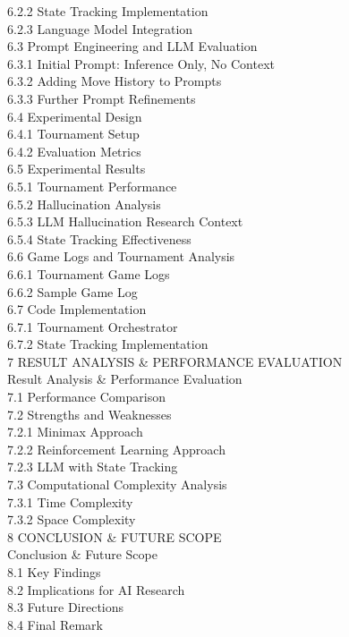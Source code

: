 \documentclass[11pt,a4paper]{report}
\begin{document}
6.2.2 State Tracking Implementation \\
6.2.3 Language Model Integration \\
6.3 Prompt Engineering and LLM Evaluation \\
6.3.1 Initial Prompt: Inference Only, No Context \\
6.3.2 Adding Move History to Prompts \\
6.3.3 Further Prompt Refinements \\
6.4 Experimental Design \\
6.4.1 Tournament Setup \\
6.4.2 Evaluation Metrics \\
6.5 Experimental Results \\
6.5.1 Tournament Performance \\
6.5.2 Hallucination Analysis \\
6.5.3 LLM Hallucination Research Context \\
6.5.4 State Tracking Effectiveness \\
6.6 Game Logs and Tournament Analysis \\
6.6.1 Tournament Game Logs \\
6.6.2 Sample Game Log \\
6.7 Code Implementation \\
6.7.1 Tournament Orchestrator \\
6.7.2 State Tracking Implementation \\
7 RESULT ANALYSIS \& PERFORMANCE EVALUATION \\
Result Analysis \& Performance Evaluation \\
7.1 Performance Comparison \\
7.2 Strengths and Weaknesses \\
7.2.1 Minimax Approach \\
7.2.2 Reinforcement Learning Approach \\
7.2.3 LLM with State Tracking \\
7.3 Computational Complexity Analysis \\
7.3.1 Time Complexity \\
7.3.2 Space Complexity \\
8 CONCLUSION \& FUTURE SCOPE \\
Conclusion \& Future Scope \\
8.1 Key Findings \\
8.2 Implications for AI Research \\
8.3 Future Directions \\
8.4 Final Remark
\clearpage
\end{document}
